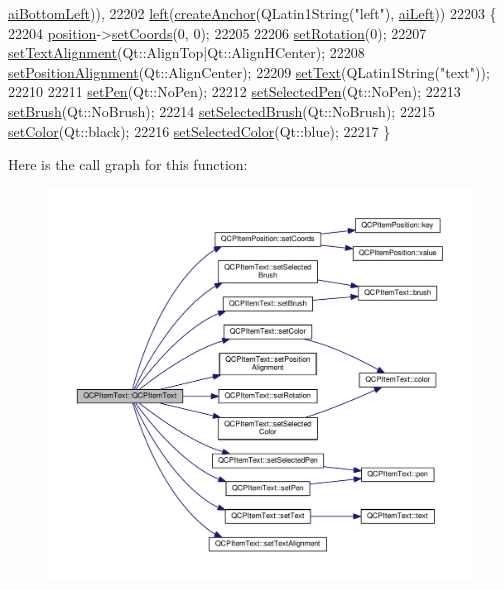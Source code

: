 \begin{DoxyCode}
      \hyperlink{class_q_c_p_item_text_a14a84e58f72519c8ae1d7a4a1dd23f21a489ec73da5a18c15e98a4f9b17ed301f}{aiBottomLeft})),
22202   \hyperlink{class_q_c_p_item_text_ab8c6c6e1df36256986fab1463c0a1d38}{left}(\hyperlink{class_q_c_p_abstract_item_af3fc92527802078ca395138748b629a7}{createAnchor}(QLatin1String(\textcolor{stringliteral}{"left"}), \hyperlink{class_q_c_p_item_text_a14a84e58f72519c8ae1d7a4a1dd23f21a7f1c1b8c574c753e300a4759915a9170}{aiLeft}))
22203 \{
22204   \hyperlink{class_q_c_p_item_text_a0d228a00e819022b5690c65762721129}{position}->\hyperlink{class_q_c_p_item_position_aa988ba4e87ab684c9021017dcaba945f}{setCoords}(0, 0);
22205   
22206   \hyperlink{class_q_c_p_item_text_a4bcc10cd97952c3f749d75824b5077f0}{setRotation}(0);
22207   \hyperlink{class_q_c_p_item_text_ab5bc0684c4d1bed81949a11b34dba478}{setTextAlignment}(Qt::AlignTop|Qt::AlignHCenter);
22208   \hyperlink{class_q_c_p_item_text_a781cdf8c640fc6a055dcff1e675c8c7a}{setPositionAlignment}(Qt::AlignCenter);
22209   \hyperlink{class_q_c_p_item_text_a3dacdda0ac88f99a05b333b977c48747}{setText}(QLatin1String(\textcolor{stringliteral}{"text"}));
22210   
22211   \hyperlink{class_q_c_p_item_text_a9b9ec6eea0eb0603977ff84d4c78d0a3}{setPen}(Qt::NoPen);
22212   \hyperlink{class_q_c_p_item_text_a291febe586f0da3f1c392e77bef4aa20}{setSelectedPen}(Qt::NoPen);
22213   \hyperlink{class_q_c_p_item_text_a1c7e131516df2ed8d941ef31240ded8e}{setBrush}(Qt::NoBrush);
22214   \hyperlink{class_q_c_p_item_text_a6b8377eeb2af75eb9528422671ac16cb}{setSelectedBrush}(Qt::NoBrush);
22215   \hyperlink{class_q_c_p_item_text_aa51efc0841fe52da9eaf8aff6fc8a8b2}{setColor}(Qt::black);
22216   \hyperlink{class_q_c_p_item_text_ae7ba0bdb75c897b028388e45bfd435fa}{setSelectedColor}(Qt::blue);
22217 \}
\end{DoxyCode}


Here is the call graph for this function\+:\nopagebreak
\begin{figure}[H]
\begin{center}
\leavevmode
\includegraphics[width=350pt]{class_q_c_p_item_text_a77ff96a2972a00872ff8f8c67143abbe_cgraph}
\end{center}
\end{figure}


